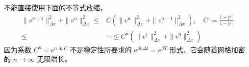\begin{remark}
    不能直接使用下面的不等式放缩，
    \begin{align*}
        \|v^{n+1}\|_{\Delta x}^2 +\|v^{n}\|_{\Delta x}^2 \le{} &
        C \left(\|v^{n}\|_{\Delta x}^2 +\|v^{n-1}\|_{\Delta x}^2\right),\quad C:= \frac{1+|r|}{1-|r|} \\
        \le{}                                                  & \cdots \le{}
        C^n \left(\|v^{1}\|_{\Delta x}^2 +\|v^{0}\|_{\Delta x}^2\right)
    \end{align*}
    因为系数 $C^n = e^{n \ln C}$ 不是稳定性所要求的 $e^{\beta n \Delta t} = e^{\beta T}$ 形式，它会随着网格加密的 $n \to \infty$ 无限增长。
\end{remark}
